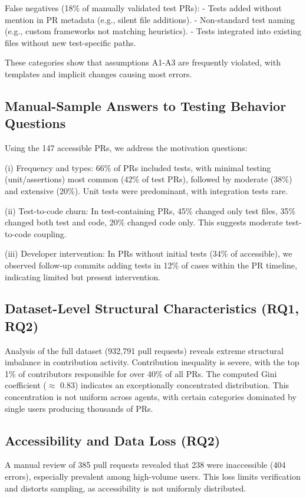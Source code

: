 \documentclass[conference]{IEEEtran}
\begin{document}
False negatives (18\% of manually validated test PRs):
- Tests added without mention in PR metadata (e.g., silent file additions).
- Non-standard test naming (e.g., custom frameworks not matching heuristics).
- Tests integrated into existing files without new test-specific paths.

These categories show that assumptions A1-A3 are frequently violated, with templates and implicit changes causing most errors.

\subsection{Manual-Sample Answers to Testing Behavior Questions}

Using the 147 accessible PRs, we address the motivation questions:

(i) Frequency and types: 66\% of PRs included tests, with minimal testing (unit/assertions) most common (42\% of test PRs), followed by moderate (38\%) and extensive (20\%). Unit tests were predominant, with integration tests rare.

(ii) Test-to-code churn: In test-containing PRs, 45\% changed only test files, 35\% changed both test and code, 20\% changed code only. This suggests moderate test-to-code coupling.

(iii) Developer intervention: In PRs without initial tests (34\% of accessible), we observed follow-up commits adding tests in 12\% of cases within the PR timeline, indicating limited but present intervention.

\subsection{Dataset-Level Structural Characteristics (RQ1, RQ2)}
Analysis of the full dataset (932,791 pull requests) reveals extreme structural imbalance in contribution activity. Contribution inequality is severe, with the top 1\% of contributors responsible for over 40\% of all PRs. The computed Gini coefficient ($\approx$ 0.83) indicates an exceptionally concentrated distribution. This concentration is not uniform across agents, with certain categories dominated by single users producing thousands of PRs.

\subsection{Accessibility and Data Loss (RQ2)}
A manual review of 385 pull requests revealed that 238 were inaccessible (404 errors), especially prevalent among high-volume users. This loss limits verification and distorts sampling, as accessibility is not uniformly distributed.
\end{document}
